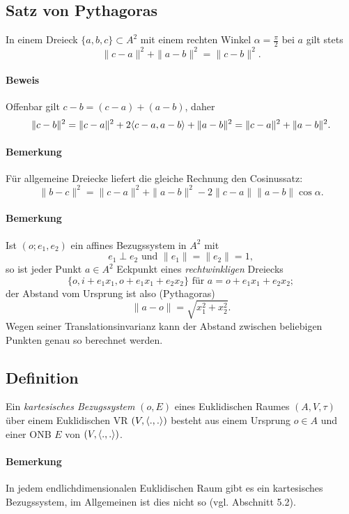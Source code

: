 \subsection{Satz von Pythagoras}
\begin{Satz}
	 In einem Dreieck $ \{a,b,c\}\subset A^2 $ mit einem rechten Winkel $ \alpha = \frac{\pi}{2} $ bei $ a $ gilt stets
		 \[ \|c-a\|^2+\|a-b\|^2 = \|c-b\|^2. \]
\end{Satz}
\paragraph{Beweis}
	Offenbar gilt $ c-b = (c-a)+(a-b) $, daher
		\[ \|c-b\|^2 = \|c-a\|^2 + 2\langle c-a,a-b \rangle+\|a-b\|^2 = \|c-a\|^2+\|a-b\|^2. \]
\paragraph{Bemerkung}
	Für allgemeine Dreiecke liefert die gleiche Rechnung den Cosinussatz:
		\[ \|b-c\|^2 = \|c-a\|^2+\|a-b\|^2- 2\|c-a\|\|a-b\|\cos \alpha. \]
\paragraph{Bemerkung}
	Ist $ (o;e_1,e_2) $ ein affines Bezugssystem in $ A^2 $ mit
		\[ e_1 \perp e_2 \text{ und } \|e_1\| = \|e_2\| = 1, \]
	so ist jeder Punkt $ a\in A^2 $ Eckpunkt eines \emph{rechtwinkligen} Dreiecks
		\[ \{o,i+e_1x_1,o+e_1x_1+e_2x_2\} \text{ für } a = o+e_1x_1+e_2x_2; \]
	der Abstand vom Ursprung ist also (Pythagoras)
		\[ \|a-o\| = \sqrt{x_1^2+x_2^2}. \]
	Wegen seiner Translationsinvarianz kann der Abstand zwischen beliebigen Punkten genau so berechnet werden.
	
\subsection{Definition}
\begin{Definition}
	Ein \emph{kartesisches Bezugssystem} $ (o,E) $ eines Euklidischen Raumes $ (A,V,\tau) $ über einem Euklidischen VR $ (V,\langle .,. \rangle) $ besteht aus einem Ursprung $ o\in A $ und einer ONB $ E $ von $ (V,\langle .,. \rangle) $.
\end{Definition}
\paragraph{Bemerkung}
	In jedem endlichdimensionalen Euklidischen Raum gibt es ein kartesisches Bezugssystem, im Allgemeinen ist dies nicht so (vgl. Abschnitt 5.2).
	
